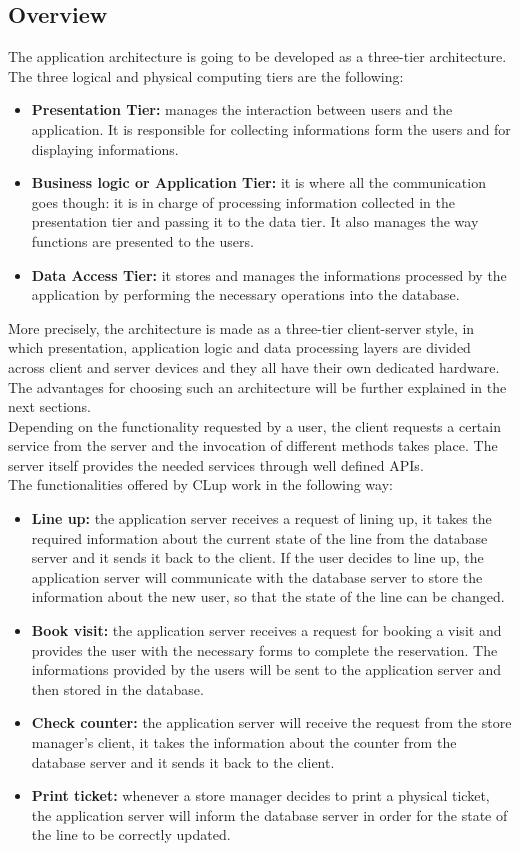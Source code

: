 \documentclass{article}
\begin{document}
\subsection{Overview}
The application architecture is going to be developed as a three-tier architecture. The three logical and physical computing tiers are the following:
\begin{itemize}
\item\textbf{Presentation Tier:} manages the interaction between users and the application. It is responsible for collecting informations form the users and for displaying informations.
\item\textbf{Business logic or Application Tier:} it is where all the communication goes though: it is in charge of processing information collected in the presentation tier and passing it to the data tier. It also manages the way functions are presented to the users.
\item\textbf{Data Access Tier:} it stores and manages the informations processed by the application by performing the necessary operations into the database.
\end{itemize}
More precisely, the architecture is made as a three-tier client-server style, in which presentation, application logic and data processing layers are divided across client and server devices and they all have their own dedicated hardware. The advantages for choosing such an architecture will be further explained in the next sections.
\smallskip\\
Depending on the functionality requested by a user, the client requests a certain service from the server and the invocation of different methods takes place. The server itself provides the needed services through well defined APIs.
\smallskip\\
The functionalities offered by CLup work in the following way:
\begin{itemize}
\item\textbf{Line up:} the application server receives a request of lining up, it takes the required information about the current state of the line from the database server and it sends it back to the client. If the user decides to line up, the application server will communicate with the database server to store the information about the new user, so that the state of the line can be changed. 
\item\textbf{Book visit:} the application server receives a request for booking a visit and provides the user with the necessary forms to complete the reservation. The informations provided by the users will be sent to the application server and then stored in the database.
\item\textbf{Check counter:} the application server will receive the request from the store manager’s client, it takes the information about the counter from the database server and it sends it back to the client.
\item\textbf{Print ticket:} whenever a store manager decides to print a physical ticket, the application server will inform the database server in order for the state of the line to be correctly updated.
\end{itemize}
\end{document}
